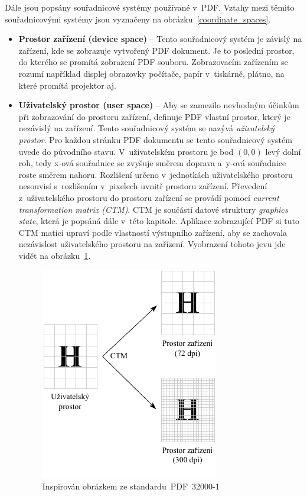 Dále jsou popsány souřadnicové systémy používané v~PDF. Vztahy mezi těmito
souřadnicovými systémy jsou vyznačeny na obrázku~\ref{coordinate_spaces}.
\begin{itemize}
    \item \textbf{Prostor zařízení (device space)} -- Tento souřadnicový systém je
    závislý na zařízení, kde se zobrazuje vytvořený PDF dokument. Je to poslední
    prostor, do kterého se promítá zobrazení PDF souboru. Zobrazovacím zařízením
    se rozumí například displej obrazovky počítače, papír v~tiskárně, plátno, na
    které promítá projektor aj.
    
    \item \textbf{Uživatelský prostor (user space)} -- Aby se zamezilo nevhodným
    účinkům při zobrazování do prostoru zařízení, definuje PDF vlastní prostor,
    který je nezávislý na zařízení. Tento souřadnicový systém se nazývá
    \emph{uživatelský prostor}. Pro každou stránku PDF dokumentu se tento
    souřadnicový systém uvede do původního stavu. V~uživatelském prostoru je bod
    $(0, 0)$ levý dolní roh, tedy x-ová souřadnice se zvyšuje směrem
    doprava a~y-ová souřadnice roste směrem nahoru. Rozlišení určeno v~jednotkách
    uživatelského prostoru nesouvisí s~rozlišením v~pixelech uvnitř prostoru
    zařízení. Převedení z~uživatelského prostoru do prostoru zařízení se provádí
    pomocí \emph{current transformation matrix (CTM)}. CTM je součástí datové
    struktury \emph{graphics state}, která je popsáná dále v~této kapitole.
    Aplikace zobrazující PDF si tuto CTM matici upraví podle vlastností výstupního
    zařízení, aby se zachovala nezávislost uživatelského prostoru na zařízení. 
    Vyobrazení tohoto jevu jde vidět na obrázku~\ref{pic_user_to_device}.

    \begin{figure}[H]
        \centering
        \includegraphics[width=0.5\linewidth]{obrazky-figures/user_to_device_space.pdf}
        \caption{ Inspirován obrázkem ze standardu~PDF~32000-1~\cite{PDF32000-1:2008}}
        \label{pic_user_to_device}
    \end{figure}
    

\end{itemize}
